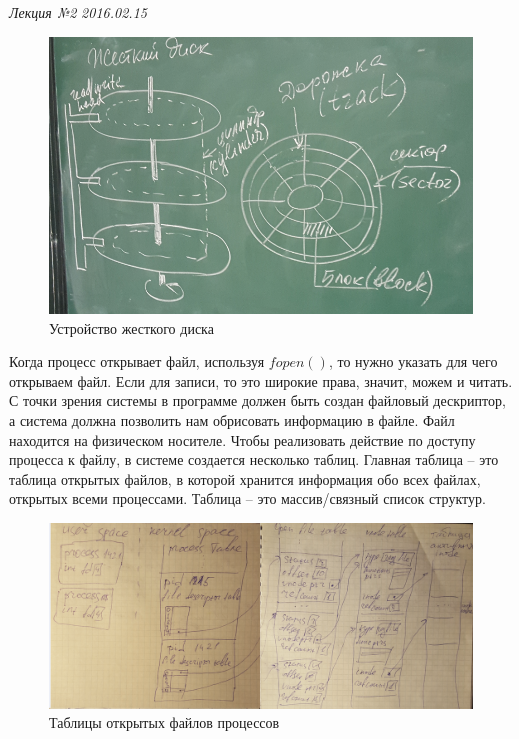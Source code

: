 \clearpage
\begin{flushright}
	\textit{Лекция №2}
	\textit{2016.02.15}
\end{flushright}

\begin{figure}[H]
  \centering
  \includegraphics[width=\textwidth]{pic/1.png}
  \caption{Устройство жесткого диска}
\end{figure}

Когда процесс открывает файл, используя $fopen()$, то нужно указать для чего открываем файл. Если для записи, то это широкие права, значит, можем и читать.  С точки зрения системы в программе должен быть создан файловый дескриптор, а система должна позволить нам обрисовать информацию в файле. Файл находится на физическом носителе. Чтобы реализовать действие по доступу процесса к файлу, в системе создается несколько таблиц. Главная таблица – это таблица открытых файлов, в которой хранится информация обо всех файлах, открытых всеми процессами. Таблица – это массив/связный список структур.

\begin{figure}[H]
  \centering
  \includegraphics[width=\textwidth]{pic/2.png}
  \caption{Таблицы открытых файлов процессов}
\end{figure}

